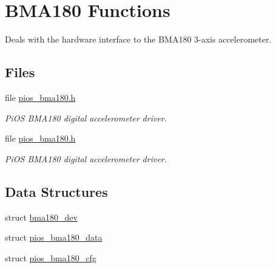 \hypertarget{group___p_i_o_s___b_m_a180}{\section{B\-M\-A180 Functions}
\label{group___p_i_o_s___b_m_a180}
}


Deals with the hardware interface to the B\-M\-A180 3-\/axis accelerometer.  


\subsection*{Files}
\begin{DoxyCompactItemize}
\item 
file \hyperlink{pios__bma180_8h}{pios\-\_\-bma180.\-h}
\begin{DoxyCompactList}\small\item\em Pi\-O\-S B\-M\-A180 digital accelerometer driver. \end{DoxyCompactList}\item 
file \hyperlink{pios__bma180_8h}{pios\-\_\-bma180.\-h}
\begin{DoxyCompactList}\small\item\em Pi\-O\-S B\-M\-A180 digital accelerometer driver. \end{DoxyCompactList}\end{DoxyCompactItemize}
\subsection*{Data Structures}
\begin{DoxyCompactItemize}
\item 
struct \hyperlink{structbma180__dev}{bma180\-\_\-dev}
\item 
struct \hyperlink{structpios__bma180__data}{pios\-\_\-bma180\-\_\-data}
\item 
struct \hyperlink{structpios__bma180__cfg}{pios\-\_\-bma180\-\_\-cfg}
\end{DoxyCompactItemize}
